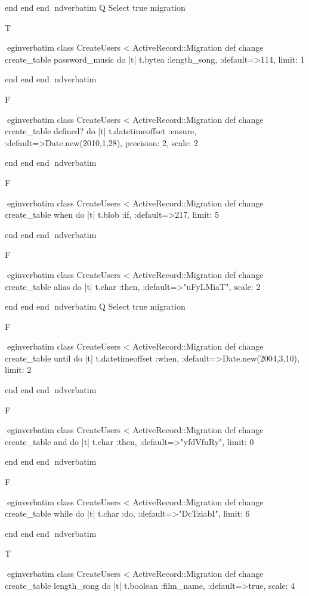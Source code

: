     end 
  end 
end
nd{verbatim}
Q
 Select true migration

T

egin{verbatim}
 class CreateUsers < ActiveRecord::Migration 
  def change 
    create_table password_music do |t| 
      t.bytea :length_song, :default=>114, limit: 1
    
    end 
  end 
end
nd{verbatim}

F

egin{verbatim}
 class CreateUsers < ActiveRecord::Migration 
  def change 
    create_table defined? do |t| 
      t.datetimeoffset :ensure, :default=>Date.new(2010,1,28), precision: 2, scale: 2
    
    end 
  end 
end
nd{verbatim}

F

egin{verbatim}
 class CreateUsers < ActiveRecord::Migration 
  def change 
    create_table when do |t| 
      t.blob :if, :default=>217, limit: 5
    
    end 
  end 
end
nd{verbatim}

F

egin{verbatim}
 class CreateUsers < ActiveRecord::Migration 
  def change 
    create_table alias do |t| 
      t.char :then, :default=>"uFyLMiaT", scale: 2
    
    end 
  end 
end
nd{verbatim}
Q
 Select true migration

F

egin{verbatim}
 class CreateUsers < ActiveRecord::Migration 
  def change 
    create_table until do |t| 
      t.datetimeoffset :when, :default=>Date.new(2004,3,10), limit: 2
    
    end 
  end 
end
nd{verbatim}

F

egin{verbatim}
 class CreateUsers < ActiveRecord::Migration 
  def change 
    create_table and do |t| 
      t.char :then, :default=>"yfdVfuRy", limit: 0
    
    end 
  end 
end
nd{verbatim}

F

egin{verbatim}
 class CreateUsers < ActiveRecord::Migration 
  def change 
    create_table while do |t| 
      t.char :do, :default=>"DcTziabI", limit: 6
    
    end 
  end 
end
nd{verbatim}

T

egin{verbatim}
 class CreateUsers < ActiveRecord::Migration 
  def change 
    create_table length_song do |t| 
      t.boolean :film_name, :default=>true, scale: 4
    
